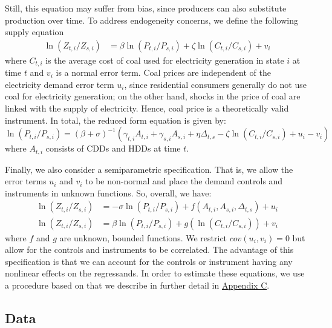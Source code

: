 \documentclass[11pt,a4paper,leqno]{extarticle}
\begin{document}
	Still, this equation may suffer from bias, since producers can also substitute production over time. To address endogeneity concerns, we define the following supply equation
	\begin{align*}
	\ln (Z_{ t, i} / Z_{ s, i}) &= \beta \ln (P_{t,i} / P_{s,i}) + \zeta \ln (C_{t,i} / C_{s,i}) + v_{i}
	\end{align*}
	where $C_{t,i}$ is the average cost of coal used for electricity generation in state $i$ at time $t$ and $v_i$ is a normal error term. Coal prices are independent of the electricity demand error term $u_i$, since residential consumers generally do not  use coal for electricity generation; on the other hand, shocks in the price of coal are linked with the supply of electricity. Hence, coal price is a theoretically valid instrument.  In total, the reduced form equation is given by:
	\begin{equation}
	\ln (P_{t,i} / P_{s,i}) = \left( \beta + \sigma \right)^{-1} \left( \gamma_{t,i} A_{t,i} + \gamma_{s,i} A_{s,i} + \eta \Delta_{t,s} - \zeta \ln (C_{t,i} / C_{s,i}) + u_{i} - v_i \right)  
	\end{equation}
	where $A_{t,i}$ consists of CDDs and HDDs at time $t$. 
	
	Finally, we also consider a semiparametric specification. That is, we allow the error terms $u_i$ and $v_i$ to be non-normal and place the demand controls and instruments in unknown functions. So, overall, we have:
	\begin{align} \label{eq:pariv1}
	\ln (Z_{ t, i} / Z_{ s, i}) &= -\sigma \ln (P_{t,i} / P_{s,i}) +  f \left( A_{t,i}, A_{s,i}, \Delta_{t,s} \right) + u_i \\
	\ln (Z_{ t, i} / Z_{ s, i}) &= \beta \ln (P_{t,i} / P_{s,i}) + g \left( \ln (C_{t,i} / C_{s,i})  \right) + v_{i} \label{eq:pariv2}
	\end{align}
	where $f$ and $g$ are unknown, bounded functions. We restrict $cov(u_i, v_i) = 0$ but allow for the controls and instruments to be correlated. The advantage of this specification is that we can account for the controls or instrument having any nonlinear effects on the regressands. In order to estimate these equations, we use a procedure based on \citet{Newey} that we describe in further detail in \hyperref[sec:AppendixC]{Appendix C}.  \noindent
	
	\noindent
	\subsection{Data}
	
\end{document}
